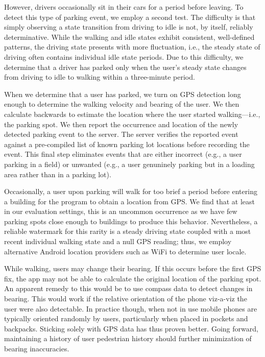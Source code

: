 However, drivers occasionally sit in their cars for a period before leaving.
To detect this type of parking event, we employ a second test. The difficulty is
that simply observing a state transition from driving to idle is
not, by itself, reliably determinative. While the walking and idle states
exhibit consistent, well-defined patterns, the driving state presents with
more fluctuation, i.e., the steady state of driving often contains individual
idle state periods. Due to this difficulty, we determine that a driver has
parked only when the user's steady state changes from driving to idle to walking
within a three-minute period.

When we determine that a user has parked, we turn on GPS detection long enough
to determine the walking velocity and bearing of the user. We then calculate
backwards to estimate the location where the user started walking---i.e., the
parking spot. We then report the occurrence and location of the newly detected
parking event to the server. The server verifies the reported event against a
pre-compiled list of known parking lot locations before recording the event.
This final step eliminates events that are either incorrect (e.g., a user
parking in a field) or unwanted (e.g., a user genuninely parking but in a
loading area rather than in a parking lot).

Occasionally, a user upon parking will walk for too brief a period before
entering a building for the program to obtain a location from GPS. We find that
at least in our evaluation settings, this is an uncommon occurrence as we have
few parking spots close enough to buildings to produce this behavior.
Nevertheless, a reliable watermark for this rarity is a steady driving state
coupled with a most recent individual walking state and a null GPS reading;
thus, we employ alternative Android location providers such as WiFi to determine
user locale.

While walking, users may change their bearing. If this occurs before the
first GPS fix, the app may not be able to calculate the original location of
the parking spot. An apparent remedy to this would be to use compass data to
detect changes in bearing. This would work if the relative orientation of the
phone viz-a-viz the user were also detectable. In practice though, when not
in use mobile phones are typically oriented randomly by users, particularly
when placed in pockets and backpacks. Sticking solely with GPS data has thus
proven better. Going forward, maintaining a history of user pedestrian
history should further minimization of bearing inaccuracies.

